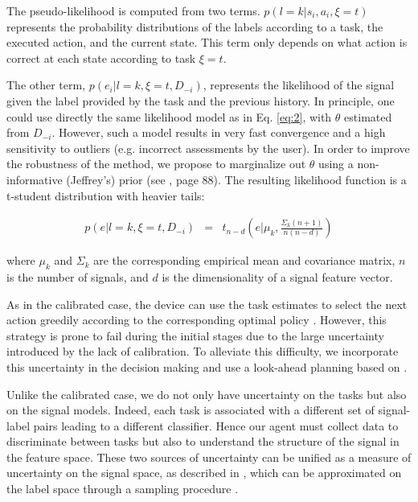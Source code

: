 The pseudo-likelihood is computed from two terms. $p(l=k|s_i,a_i,\xi=t)$ represents the probability distributions of the labels according to a task, the executed action, and the current state. This term only depends on what action is correct at each state according to task $\xi=t$.   

The other term, $p(e_i | l=k,\xi=t, D_{-i})$, represents the likelihood of the signal given the label provided by the task and the previous history. In principle, one could use directly the same likelihood model as in Eq. \ref{eq:2}, with $\theta$ estimated from $D_{-i}$. However, such a model results in very fast convergence and a high sensitivity to outliers (e.g. incorrect assessments by the user). In order to improve the robustness of the method, we propose to marginalize out $\theta$  using a non-informative (Jeffrey's) prior (see \cite{gelman2003bayesian}, page 88). The resulting likelihood function is a t-student distribution with heavier tails:

\begin{eqnarray}
p(e| l=k,\xi=t, D_{-i}) & = & t_{n-d}\left(e | \mu_k,\frac{\Sigma_k (n+1)}{n(n-d)}\right)
\end{eqnarray}

where $\mu_k$ and $\Sigma_k$ are the corresponding empirical mean and covariance matrix, $n$ is the number of signals, and $d$ is the dimensionality of a signal feature vector.
%

As in the calibrated case, the device can use the task estimates to select the next action greedily according to the corresponding optimal policy \cite{iturrate13}. However, this strategy is prone to fail during the initial stages due to the large uncertainty introduced by the lack of calibration. To alleviate this difficulty, we incorporate this uncertainty in the decision making and use a look-ahead planning based on \cite{grizou2014interactive}.

Unlike the calibrated case, we do not only have uncertainty on the tasks but also on the signal models. Indeed, each task is associated with a different set of signal-label pairs leading to a different classifier. Hence our agent must collect data to discriminate between tasks but also to understand the structure of the signal in the feature space. These two sources of uncertainty can be unified as a measure of uncertainty on the signal space, as described in \cite{grizou2014calibration}, which can be approximated on the label space through a sampling procedure \cite{grizou2014interactive}.

